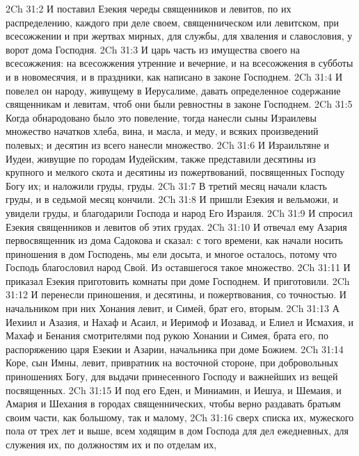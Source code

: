 \vs 2Ch 31:2 И поставил Езекия череды священников и левитов, по их распределению, каждого при деле своем, священническом или левитском, при всесожжении и при жертвах мирных, для службы, для хваления и славословия, у ворот дома Господня.
\vs 2Ch 31:3 И  царь часть из имущества своего на всесожжения: на всесожжения утренние и вечерние, и на всесожжения в субботы и в новомесячия, и в праздники, как написано в законе Господнем.
\vs 2Ch 31:4 И повелел он народу, живущему в Иерусалиме, давать определенное содержание священникам и левитам, чтоб они были ревностны в законе Господнем.
\rsbpar\vs 2Ch 31:5 Когда обнародовано было это повеление, тогда нанесли сыны Израилевы множество начатков хлеба, вина, и масла, и меду, и всяких произведений полевых; и десятин из всего нанесли множество.
\vs 2Ch 31:6 И Израильтяне и Иудеи, живущие по городам Иудейским, также представили десятины из крупного и мелкого скота и десятины из пожертвований, посвященных Господу Богу их; и наложили груды, груды.
\vs 2Ch 31:7 В третий месяц начали класть груды, и в седьмой месяц кончили.
\vs 2Ch 31:8 И пришли Езекия и вельможи, и увидели груды, и благодарили Господа и народ Его Израиля.
\vs 2Ch 31:9 И спросил Езекия священников и левитов об этих грудах.
\vs 2Ch 31:10 И отвечал ему Азария первосвященник из дома Садокова и сказал: с того времени, как начали носить приношения в дом Господень, мы ели досыта, и многое осталось, потому что Господь благословил народ Свой. Из оставшегося  такое множество.
\vs 2Ch 31:11 И приказал Езекия приготовить комнаты при доме Господнем. И приготовили.
\vs 2Ch 31:12 И перенесли  приношения, и десятины, и пожертвования, со  точностью. И  начальником при них Хонания левит, и Симей, брат его, вторым.
\vs 2Ch 31:13 А Иехиил и Азазия, и Нахаф и Асаил, и Иеримоф и Иозавад, и Елиел и Исмахия, и Махаф и Бенания  смотрителями под рукою Хонании и Симея, брата его, по распоряжению царя Езекии и Азарии, начальника при доме Божием.
\vs 2Ch 31:14 Коре, сын Имны, левит, привратник на восточной стороне,  при добровольных приношениях Богу, для выдачи принесенного Господу и важнейших из вещей посвященных.
\vs 2Ch 31:15 И под его  Еден, и Миниамин, и Иешуа, и Шемаия, и Амария и Шехания в городах священнических, чтобы верно раздавать братьям своим части, как большому, так и малому,
\vs 2Ch 31:16 сверх списка их,  мужеского пола от трех лет и выше, всем ходящим в дом Господа для дел ежедневных, для служения их, по должностям их и по отделам их,
